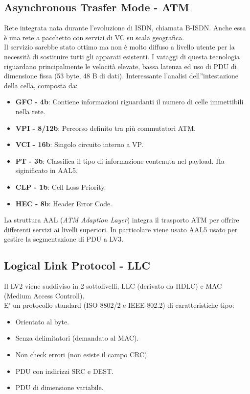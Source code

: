 \documentclass[12pt]{article}
\begin{document}
\subsection{Asynchronous Trasfer Mode - ATM}
Rete integrata nata durante l'evoluzione di ISDN, chiamata B-ISDN. Anche essa è una rete a pacchetto con servizi di VC su scala geografica.\\
 Il servizio sarebbe stato ottimo ma non è molto diffuso a livello utente per la necessità di sostituire tutti gli apparati esistenti. I vataggi di questa tecnologia riguardano principalmente le velocità elevate, bassa latenza ed uso di PDU di dimensione fissa (53 byte, 48 B di dati). Interessante l'analisi dell''intestazione della cella, composta da:
 \begin{itemize}
   \item \textbf{GFC - 4b}: Contiene informazioni riguardanti il numero di celle immettibili nella rete.
   \item \textbf{VPI - 8/12b}: Percorso definito tra più commutatori ATM.
   \item \textbf{VCI - 16b}: Singolo circuito interno a VP.
   \item \textbf{PT - 3b}: Classifica il tipo di informazione contenuta nel payload. Ha siginificato in AAL5.
   \item \textbf{CLP - 1b}: Cell Loss Priority.
   \item \textbf{HEC - 8b}: Header Error Code.
 \end{itemize}
La struttura AAL (\textit{ATM Adaption Layer}) integra il trasporto ATM per offrire differenti servizi ai livelli superiori. In particolare viene usato AAL5 usato per gestire la segmentazione di PDU a LV3.

\subsection{Logical Link Protocol - LLC}
Il LV2 viene suddiviso in 2 sottolivelli, LLC (derivato da HDLC) e MAC (Medium Access Controll).\\
E' un protocollo standard (ISO 8802/2 e IEEE 802.2) di caratteristiche tipo:
\begin{itemize}
  \item Orientato al byte.
  \item Senza delimitatori (demandato al MAC).
  \item Non check errori (non esiste il campo CRC).
  \item PDU con indirizzi SRC e DEST.
  \item PDU di dimensione variabile.
\end{itemize}
\end{document}
